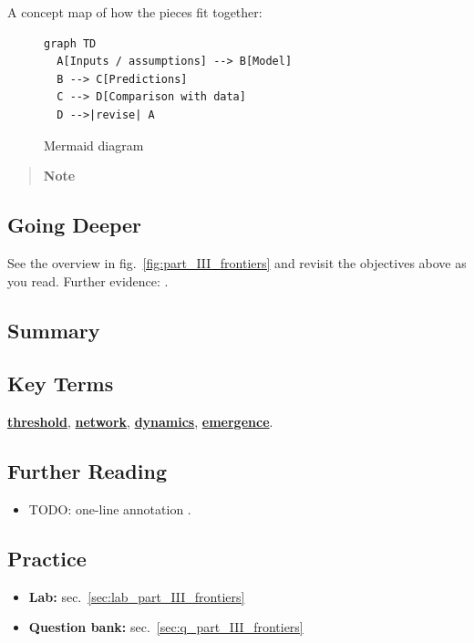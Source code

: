 \documentclass[
]{article}
\providecommand{\tightlist}{%
  \setlength{\itemsep}{0pt}\setlength{\parskip}{0pt}}
\theoremstyle{plain}
\theoremstyle{definition}
\begin{document}
A concept map of how the pieces fit together:

\begin{figure}[htbp]
\centering
\begin{verbatim}
graph TD
  A[Inputs / assumptions] --> B[Model]
  B --> C[Predictions]
  C --> D[Comparison with data]
  D -->|revise| A
\end{verbatim}
\caption{Mermaid diagram}
\end{figure}

\begin{quote}
\textbf{Note}
\end{quote}

\subsection{Going Deeper}\label{going-deeper-9}

See the overview in fig.~\ref{fig:part_III_frontiers} and revisit the
objectives above as you read. Further evidence:
\citep{wilson2021analysis, taylor2019theory}.

\subsection{Summary}\label{summary-11}

\subsection{Key Terms}\label{key-terms-11}

\hyperref[gl:threshold]{\textbf{threshold}},
\hyperref[gl:network]{\textbf{network}},
\hyperref[gl:dynamics]{\textbf{dynamics}},
\hyperref[gl:emergence]{\textbf{emergence}}.

\subsection{Further Reading}\label{further-reading-11}

\begin{itemize}
\item
  TODO: one-line annotation \citep{smith2020foundations}.
\end{itemize}

\subsection{Practice}\label{practice-11}

\begin{itemize}
\tightlist
\item
  \textbf{Lab:} sec.~\ref{sec:lab_part_III_frontiers}
\item
  \textbf{Question bank:} sec.~\ref{sec:q_part_III_frontiers}
\end{itemize}
\end{document}
